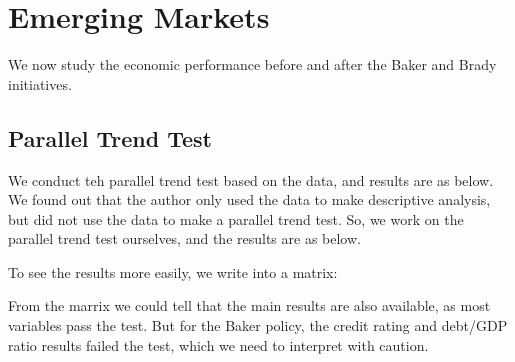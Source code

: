 



\section{Emerging Markets}

We now study the economic performance before and after the Baker and Brady
initiatives.

\subsection{Parallel Trend Test}

We conduct teh parallel trend test based on the data, and results are as below.
We found out that the author only used the data to make descriptive analysis, but did not
use the data to make a parallel trend test. So, we work on the parallel trend test ourselves, and the results are as below.

To see the results more easily, we write into a matrix:

From the marrix we could tell that the main results are also available,
as most variables pass the test. But for the Baker policy, the credit rating and
debt/GDP ratio results failed the test, which we need to interpret with caution.

